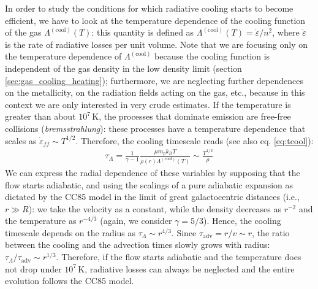 In order to study the conditions for which radiative cooling starts to become efficient, we have to look at the temperature dependence of the cooling function of the gas $\Lambda^\mathrm{(cool)}(T)$: this quantity is defined as $\Lambda^\mathrm{(cool)}(T) = \dot{\varepsilon}/n^2$, where $\dot{\varepsilon}$ is the rate of radiative losses per unit volume.  Note that we are focusing only on the temperature dependence of $\Lambda^\mathrm{(cool)}$ because the cooling function is independent of the gas density in the low density limit (section \ref{sec:gas_cooling_heating}); furthermore, we are neglecting further dependences on the metallicity, on the radiation fields acting on the gas, etc., because in this context we are only interested in very crude estimates. If the temperature is greater than about $10^7\,\mathrm{K}$, the processes that dominate emission are free-free collisions (\textit{bremsstrahlung}): these processes have a temperature dependence that scales as $\dot{\varepsilon}_{ff}\sim T^{1/2}$. Therefore, the cooling timescale reads (see also eq. \ref{eq:tcool}):
\begin{align}
    \tau_\Lambda = \frac{1}{\gamma - 1}\frac{\mu m_p k_B T}{\rho(r)\Lambda^\mathrm{(cool)}(T)} \sim \frac{T^{1/2}}{\rho}
\end{align}
We can express the radial dependence of these variables by supposing that the flow starts adiabatic, and using the scalings of a pure adiabatic expansion as dictated by the CC85 model in the limit of great galactocentric distances (i.e., $r\gg R$): we take the velocity as a constant, while the density decreases as $r^{-2}$ and the temperature as $r^{-4/3}$ (again, we consider $\gamma = 5/3$). Hence, the cooling timescale depends on the radius as $\tau_\Lambda\sim r^{4/3}$. Since $\tau_\mathrm{adv} = r/v \sim r$, the ratio between the cooling and the advection times slowly grows with radius: $\tau_\Lambda/\tau_\mathrm{adv}\sim r^{1/3}$. Therefore, if the flow starts adiabatic and the temperature does not drop under $10^7\,\mathrm{K}$, radiative losses can always be neglected and the entire evolution follows the CC85 model.

